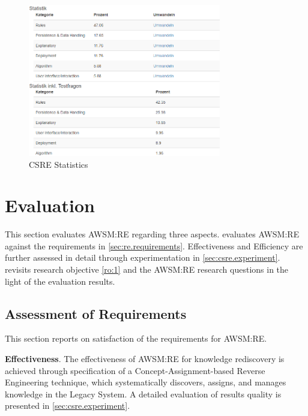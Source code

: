 \begin{figure}[h!]
\hypertarget{fig:crowdstatistics}{%
\centering
\includegraphics[width=0.75\textwidth]{../figures/screenshots/csre_statistics.png}
\caption{CSRE Statistics}\label{fig:crowdstatistics}
}
\end{figure}

\hypertarget{sec:re.evaluation}{%
\section{Evaluation}\label{sec:re.evaluation}}
\vspace{10pt}

This section evaluates AWSM:RE regarding three aspects.
 evaluates AWSM:RE against the requirements in \cref{sec:re.requirements}.
Effectiveness and Efficiency are further assessed in detail through experimentation in \cref{sec:csre.experiment}.
 revisits research objective \cref{ro:1} and the AWSM:RE research questions in the light of the evaluation results.

\vspace{-35pt}
\hypertarget{sec:re.evaluation.req}{%
\subsection{Assessment of Requirements}\label{sec:re.evaluation.req}}
\vspace{5pt}

This section reports on satisfaction of the requirements for AWSM:RE.

\vspace{-2pt}
\textbf{Effectiveness}. The effectiveness of AWSM:RE for knowledge rediscovery is achieved through specification of a Concept-Assignment-based \gls{Reverse Engineering} technique, which systematically discovers, assigns, and manages knowledge in the \gls{Legacy System}.
A detailed evaluation of results quality is presented in \cref{sec:csre.experiment}.

